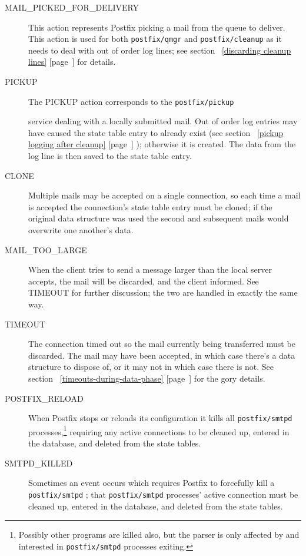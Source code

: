 \documentclass[a4paper,12pt,draft]{article}
\newcommand{\refwithpage}[1]{%
    \empty{}\ref{#1} [page~\pageref{#1}]%
}
\newcommand{\daemon}[1]{%
    \texttt{postfix/#1}%
}
\begin{document}
\begin{description}
    \item [MAIL\_PICKED\_FOR\_DELIVERY] This action represents Postfix
        picking a mail from the queue to deliver. This action is used for
        both \daemon{qmgr} and \daemon{cleanup} as it needs to deal with
        out of order log lines; see section~\refwithpage{discarding cleanup
        lines} for details.

    \item [PICKUP] The PICKUP action corresponds to the \daemon{pickup}
        service dealing with a locally submitted mail.  Out of order log
        entries may have caused the state table entry to already exist (see
        section~\refwithpage{pickup logging after cleanup}); otherwise it
        is created.  The data from the log line is then saved to the state
        table entry.

    \item [CLONE] Multiple mails may be accepted on a single connection, so
        each time a mail is accepted the connection's state table entry
        must be cloned; if the original data structure was used the second
        and subsequent mails would overwrite one another's data.

    \item [MAIL\_TOO\_LARGE] When the client tries to send a message larger
        than the local server accepts, the mail will be discarded, and the
        client informed.  See TIMEOUT for further discussion; the two are
        handled in exactly the same way.

    \item [TIMEOUT] The connection timed out so the mail currently being
        transferred must be discarded. The mail may have been accepted, in
        which case there's a data structure to dispose of, or it may not in
        which case there is not.  See
        section~\refwithpage{timeouts-during-data-phase} for the gory
        details.

    \item [POSTFIX\_RELOAD] When Postfix stops or reloads its configuration
        it kills all \daemon{smtpd} processes,\footnote{Possibly other
        programs are killed also, but the parser is only affected by and
        interested in \daemon{smtpd} processes exiting.} requiring any
        active connections to be cleaned up, entered in the database, and
        deleted from the state tables.

    \item [SMTPD\_KILLED] Sometimes an event occurs which requires Postfix
        to forcefully kill a \daemon{smtpd}; that \daemon{smtpd} processes'
        active connection must be cleaned up, entered in the database, and
        deleted from the state tables.


\end{description}
\end{document}
